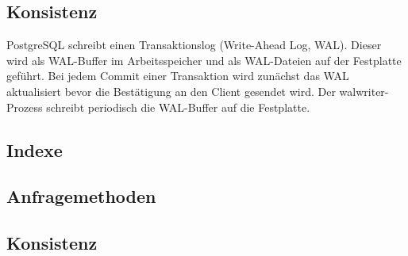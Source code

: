 \subsection{Konsistenz}
PostgreSQL schreibt einen Transaktionslog (Write-Ahead Log, WAL).
Dieser wird als WAL-Buffer im Arbeitsspeicher und als WAL-Dateien auf der Festplatte geführt.
Bei jedem Commit einer Transaktion wird zunächst das WAL aktualisiert bevor die Bestätigung an den Client gesendet wird.
Der walwriter-Prozess schreibt periodisch die WAL-Buffer auf die Festplatte.
\subsection{Indexe}
\subsection{Anfragemethoden}
\subsection{Konsistenz}

